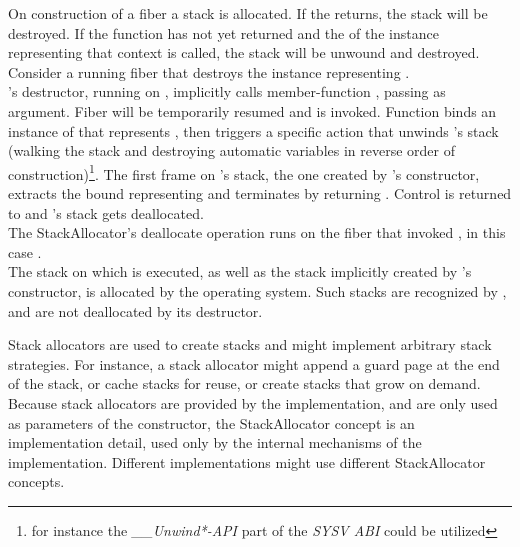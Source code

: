 \label{destruction}

On construction of a fiber a stack is allocated. If the \entryfn\xspace returns,
the stack will be destroyed. If the function has not yet returned and the
 of the \fiber instance representing that context is called,
the stack will be unwound and destroyed.\\

Consider a running fiber  that destroys the \fiber instance
representing .\\

's destructor, running on , implicitly calls member-function
\resumewith, passing \unwindfib as
argument. Fiber  will be temporarily resumed and \unwindfib is
invoked. Function \unwindfib binds an instance of \fiber that
represents , then triggers a specific action that
unwinds 's stack
(walking the stack and destroying automatic variables in reverse order of
construction)\footnote{for instance the \emph{\_\_Unwind*-API} part of the
\emph{SYSV ABI} could be utilized}.
The first frame on 's stack, the one created by \fiber's constructor,
extracts the bound \fiber representing  and terminates  by returning
. Control is returned to  and 's
stack gets deallocated.\\

The StackAllocator's deallocate operation runs on the fiber that invoked
\dtor, in this case .\\

The stack on which  is executed, as well as the stack implicitly
created by 's constructor, is allocated by the operating
system. Such stacks are recognized by \fiber, and are not deallocated by its
destructor.


\label{stackalloc}

Stack allocators are used to create stacks and might implement arbitrary stack
strategies. For instance, a stack allocator might append a guard page at the end
of the stack, or cache stacks for reuse, or create stacks that grow on demand.\\

Because stack allocators are provided by the implementation, and are only used
as parameters of the constructor, the StackAllocator concept is an
implementation detail, used only by the internal mechanisms of the
implementation. Different implementations might use different StackAllocator
concepts.\\


